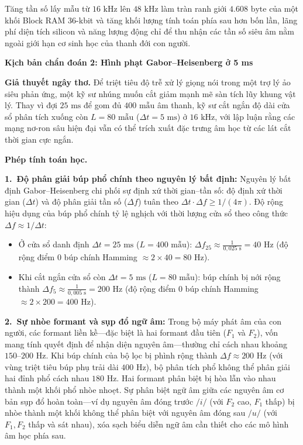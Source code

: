 \documentclass[11pt,a4paper]{article}
\newcommand{\diagsec}[1]{\vspace{1.6pt}\textbf{\large #1}\vspace{0.5pt}\par}
\begin{document}
\begin{physicalinsight}
Tăng tần số lấy mẫu từ $16\text{ kHz}$ lên $48\text{ kHz}$ làm tràn ranh giới $4{.}608\text{ byte}$ của một khối Block RAM 36-kbit và tăng khối lượng tính toán phía sau hơn bốn lần, lãng phí diện tích silicon và năng lượng động chỉ để thu nhận các tần số siêu âm nằm ngoài giới hạn cơ sinh học của thanh đới con người.
\end{physicalinsight}

\clearpage
\diagsec{Kịch bản chẩn đoán 2: Hình phạt Gabor--Heisenberg ở 5 ms}

\textbf{Giả thuyết ngây thơ.} Để triệt tiêu độ trễ xử lý giọng nói trong một trợ lý ảo siêu phản ứng, một kỹ sư nhúng muốn cắt giảm mạnh mẽ sàn tích lũy khung vật lý. Thay vì đợi $25\text{ ms}$ để gom đủ $400\text{ mẫu}$ âm thanh, kỹ sư cắt ngắn độ dài cửa sổ phân tích xuống còn $L = 80\text{ mẫu}$ ($\Delta t = 5\text{ ms}$) ở $16\text{ kHz}$, với lập luận rằng các mạng nơ-ron sâu hiện đại vẫn có thể trích xuất đặc trưng âm học từ các lát cắt thời gian cực ngắn.

\textbf{Phép tính toán học.}

\textbf{1.~Độ phân giải búp phổ chính theo nguyên lý bất định:} Nguyên lý bất định Gabor--Heisenberg chi phối sự định xứ thời gian--tần số: độ định xứ thời gian ($\Delta t$) và độ phân giải tần số ($\Delta f$) tuân theo $\Delta t \cdot \Delta f \ge 1 / (4\pi)$. Độ rộng hiệu dụng của búp phổ chính tỷ lệ nghịch với thời lượng cửa sổ theo công thức $\Delta f \approx 1 / \Delta t$:
\begin{itemize}\setlength{\itemsep}{0.2mm}\setlength{\parskip}{0pt}
  \item Ở cửa sổ danh định $\Delta t = 25\text{ ms}$ ($L = 400\text{ mẫu}$): $\Delta f_{25} \approx \frac{1}{0{,}025\text{ s}} = 40\text{ Hz}$ (độ rộng điểm 0 búp chính Hamming $\approx 2 \times 40 = 80\text{ Hz}$).
  \item Khi cắt ngắn cửa sổ còn $\Delta t = 5\text{ ms}$ ($L = 80\text{ mẫu}$): búp chính bị nới rộng thành $\Delta f_5 \approx \frac{1}{0{,}005\text{ s}} = 200\text{ Hz}$ (độ rộng điểm 0 búp chính Hamming $\approx 2 \times 200 = 400\text{ Hz}$).
\end{itemize}

\textbf{2.~Sự nhòe formant và sụp đổ ngữ âm:} Trong bộ máy phát âm của con người, các formant liền kề---đặc biệt là hai formant đầu tiên ($F_1$ và $F_2$), vốn mang tính quyết định để nhận diện nguyên âm---thường chỉ cách nhau khoảng $150\text{--}200\text{ Hz}$. Khi búp chính của bộ lọc bị phình rộng thành $\Delta f \approx 200\text{ Hz}$ (với vùng triệt tiêu búp phụ trải dài $400\text{ Hz}$), bộ phân tích phổ không thể phân giải hai đỉnh phổ cách nhau $180\text{ Hz}$. Hai formant phân biệt bị hòa lẫn vào nhau thành một khối phổ nhòe nhoẹt. Sự phân biệt ngữ âm giữa các nguyên âm cơ bản sụp đổ hoàn toàn---ví dụ nguyên âm đóng trước $/i/$ (với $F_2$ cao, $F_1$ thấp) bị nhòe thành một khối không thể phân biệt với nguyên âm đóng sau $/u/$ (với $F_1, F_2$ thấp và sát nhau), xóa sạch biểu diễn ngữ âm cần thiết cho các mô hình âm học phía sau.
\end{document}
